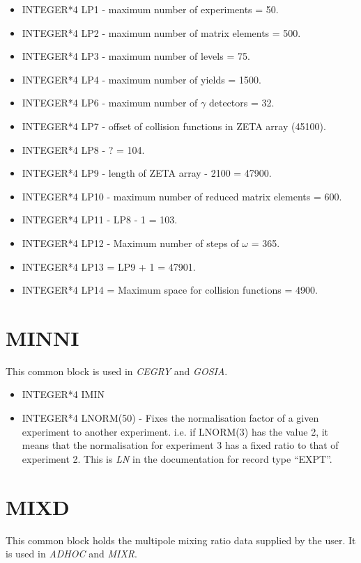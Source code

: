 \begin{itemize}
\item INTEGER*4 LP1 - maximum number of experiments = 50.
\item INTEGER*4 LP2 - maximum number of matrix elements = 500.
\item INTEGER*4 LP3 - maximum number of levels = 75.
\item INTEGER*4 LP4 - maximum number of yields = 1500.
\item INTEGER*4 LP6 - maximum number of $\gamma$ detectors = 32.
\item INTEGER*4 LP7 - offset of collision functions in ZETA array (45100).
\item INTEGER*4 LP8 - ? = 104.
\item INTEGER*4 LP9 - length of ZETA array - 2100 = 47900.
\item INTEGER*4 LP10 - maximum number of reduced matrix elements = 600.
\item INTEGER*4 LP11 - LP8 - 1 = 103.
\item INTEGER*4 LP12 - Maximum number of steps of $\omega$ = 365.
\item INTEGER*4 LP13 = LP9 + 1 = 47901.
\item INTEGER*4 LP14 = Maximum space for collision functions = 4900.
\end{itemize}

\section{MINNI}

This common block is used in {\em CEGRY} and {\em GOSIA}.

\begin{itemize}
\item INTEGER*4 IMIN
\item INTEGER*4 LNORM(50) - Fixes the normalisation factor of a given
experiment to another experiment. i.e. if LNORM(3) has the value 2, it means
that the normalisation for experiment 3 has a fixed ratio to that of
experiment 2. This is {\em LN} in the documentation for record type ``EXPT''.
\end{itemize}

\section{MIXD}

This common block holds the multipole mixing ratio data supplied by the
user. It is used in {\em ADHOC} and {\em MIXR}.

